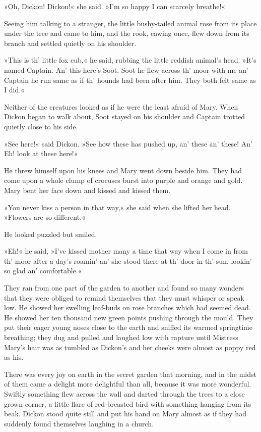 »Oh, Dickon! Dickon!« she said. »I'm so happy I can scarcely breathe!«

Seeing him talking to a stranger, the little bushy-tailed animal rose from its place under the tree and came to him, and the rook, cawing once, flew down from its branch and settled quietly on his shoulder.

»This is th' little fox cub,« he said, rubbing the little reddish animal's head. »It's named Captain. An' this here's Soot. Soot he flew across th' moor with me an' Captain he run same as if th' hounds had been after him. They both felt same as I did.«

Neither of the creatures looked as if he were the least afraid of Mary. When Dickon began to walk about, Soot stayed on his shoulder and Captain trotted quietly close to his side.

»See here!« said Dickon. »See how these has pushed up, an' these an' these! An' Eh! look at these here!«

He threw himself upon his knees and Mary went down beside him. They had come upon a whole clump of crocuses burst into purple and orange and gold. Mary bent her face down and kissed and kissed them.

»You never kiss a person in that way,« she said when she lifted her head. »Flowers are so different.«

He looked puzzled but smiled.

»Eh!« he said, »I've kissed mother many a time that way when I come in from th' moor after a day's roamin' an' she stood there at th' door in th' sun, lookin' so glad an' comfortable.«

They ran from one part of the garden to another and found so many wonders that they were obliged to remind themselves that they must whisper or speak low. He showed her swelling leaf-buds on rose branches which had seemed dead. He showed her ten thousand new green points pushing through the mould. They put their eager young noses close to the earth and sniffed its warmed springtime breathing; they dug and pulled and laughed low with rapture until Mistress Mary's hair was as tumbled as Dickon's and her cheeks were almost as poppy red as his.

There was every joy on earth in the secret garden that morning, and in the midst of them came a delight more delightful than all, because it was more wonderful. Swiftly something flew across the wall and darted through the trees to a close grown corner, a little flare of red-breasted bird with something hanging from its beak. Dickon stood quite still and put his hand on Mary almost as if they had suddenly found themselves laughing in a church.

